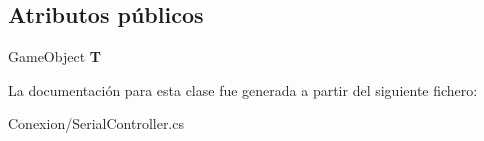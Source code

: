 \subsection*{Atributos públicos}
\begin{DoxyCompactItemize}
\item 
\mbox{\label{class_serial_controller_aad00abcbceab09c819dc5d39bcf7c4b7}} 
Game\+Object {\bfseries T}
\end{DoxyCompactItemize}


La documentación para esta clase fue generada a partir del siguiente fichero\+:\begin{DoxyCompactItemize}
\item 
Conexion/Serial\+Controller.\+cs\end{DoxyCompactItemize}
